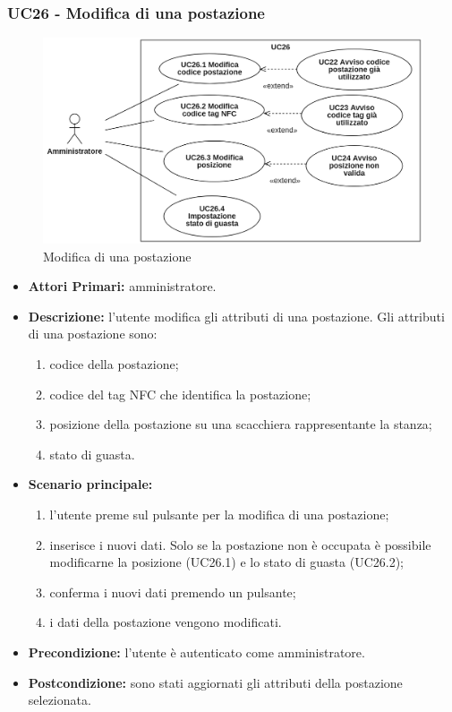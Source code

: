 \subsubsection{ UC26 - Modifica di una postazione}
\begin{figure}[H]
	\centering
	\includegraphics[width=18cm]{res/images/UC26.png}
	\caption{Modifica di una postazione}
\end{figure}
\begin{itemize}
	\item\textbf{Attori Primari:}
	amministratore.
	\item\textbf{Descrizione:}
	l'utente modifica gli attributi di una postazione.
	Gli attributi di una postazione sono:
	\begin{enumerate}
		\item codice della postazione;
		\item codice del tag NFC che identifica la postazione;
		\item posizione della postazione su una scacchiera rappresentante la stanza;
		\item stato di guasta.
	\end{enumerate}
	\item\textbf{Scenario principale:} 
	\begin{enumerate}
		\item l'utente preme sul pulsante per la modifica di una postazione;
		\item inserisce i nuovi dati. Solo se la postazione non è occupata è possibile modificarne la posizione (UC26.1) e lo stato di guasta (UC26.2);
		\item conferma i nuovi dati premendo un pulsante;
		\item i dati della postazione vengono modificati.
	\end{enumerate}
	\item\textbf{Precondizione:} 
	l'utente è autenticato come amministratore.
	\item\textbf{Postcondizione:}
	sono stati aggiornati gli attributi della postazione selezionata.
\end{itemize}

